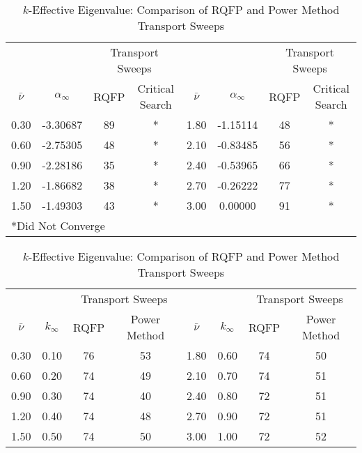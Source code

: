\begin{table}[!htbp]
	    \caption{Reference Eigenvalues/Transport Sweeps for Convergence for Problem 5.1.1}
	\label{table:InfMedNu}
	\begin{subtable}[h]{1.0\textwidth}
	\centering{}
	\begin{tabular}{@{}cccccccc@{}}\toprule
	& & \multicolumn{2}{c}{Transport Sweeps} & & & \multicolumn{2}{c}{Transport Sweeps} \\
	\cmidrule{3-4} \cmidrule{7-8} $\bar{\nu}$ & $\alpha_{\infty}$ & RQFP & Critical Search \quad &  $\bar{\nu}$ & $\alpha_{\infty}$ & RQFP & Critical Search\\
	\midrule
0.30	&	-3.30687 &	89 & * & 1.80 & -1.15114 & 48 & * \\
0.60	&	-2.75305 &	48 & * & 2.10 & -0.83485 & 56 & * \\
0.90	&	-2.28186 &	35 & * & 2.40 & -0.53965 & 66 & * \\
1.20	&	-1.86682 &	38 & * & 2.70 & -0.26222 & 77 & * \\
1.50	&	-1.49303 &	43 & * & 3.00 & 0.00000  & 91 & * \\
	\bottomrule
	\multicolumn{8}{l}{*Did Not Converge} \\
	\end{tabular}
	\caption{Alpha-Eigenvalue: Comparison of RQFP and Critical Search Transport Sweeps}
	\label{table:AlphaSweepsInf}
	\end{subtable}%
	\vspace{0.25cm}
		\begin{subtable}[h]{1.0\textwidth}
	\centering{}
	\begin{tabular}{@{}cccccccc@{}}\toprule
	& & \multicolumn{2}{c}{Transport Sweeps} & & & \multicolumn{2}{c}{Transport Sweeps} \\
	\cmidrule{3-4} \cmidrule{7-8} $\bar{\nu}$ & $k_{\infty}$ & RQFP & Power Method \quad &  $\bar{\nu}$ & $k_{\infty}$ & RQFP & Power Method \\
	\midrule
0.30 & 0.10 & 76 & 53 & 1.80 & 0.60 & 74 & 50 \\
0.60 & 0.20 & 74 & 49 & 2.10 & 0.70 & 74 & 51 \\
0.90 & 0.30 & 74 & 40 & 2.40 & 0.80 & 72 & 51 \\
1.20 & 0.40 & 74 & 48 & 2.70 & 0.90 & 72 & 51 \\
1.50 & 0.50 & 74 & 50 & 3.00 & 1.00 & 72 & 52 \\
	\bottomrule
	\end{tabular}
	\caption{$k$-Effective Eigenvalue: Comparison of RQFP and Power Method Transport Sweeps}
	\label{table:kSweepsInf}
	\end{subtable}%
\end{table}

